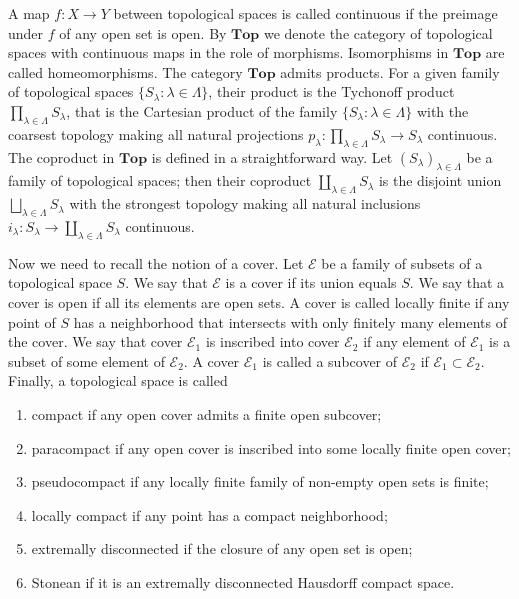 A map $f:X\to Y$ between topological spaces is called continuous if the preimage
under $f$ of any open set is open. By $\mathbf{Top}$ we denote the category of
topological spaces with continuous maps in the role of morphisms. Isomorphisms
in $\mathbf{Top}$ are called homeomorphisms. The category $\mathbf{Top}$ admits
products. For a given family of topological spaces $
\{S_\lambda:\lambda\in\Lambda \}$, their product is the Tychonoff product
$\prod_{\lambda\in\Lambda}S_\lambda$, that is the Cartesian product of the
family $ \{S_\lambda:\lambda\in\Lambda \}$ with the coarsest topology making all
natural projections $p_\lambda:\prod_{\lambda\in\Lambda}S_\lambda\to S_\lambda$
continuous. The coproduct in $\mathbf{Top}$ is defined in a straightforward way.
Let $(S_\lambda)_{\lambda\in\Lambda}$ be a family of topological spaces; then their
coproduct $\coprod_{\lambda\in\Lambda} S_\lambda$ is the disjoint union 
$\bigsqcup_{\lambda\in\Lambda} S_\lambda$ with the strongest topology making all
natural inclusions $i_\lambda:S_\lambda\to \coprod_{\lambda\in\Lambda}S_\lambda$ 
continuous.

Now we need to recall the notion of a cover.
Let $\mathcal{E}$ be a family of subsets of a topological space $S$. We say that
$\mathcal{E}$ is a cover if its union equals $S$. We say that a cover is open if
all its elements are open sets. A cover is called locally finite if any point of
$S$ has a neighborhood that intersects with only finitely many elements of the cover.
We say that cover $\mathcal{E}_1$ is inscribed into cover $\mathcal{E}_2$ if any
element of $\mathcal{E}_1$ is a subset of some element of $\mathcal{E}_2$. A
cover $\mathcal{E}_1$ is called a subcover of $\mathcal{E}_2$ if
$\mathcal{E}_1\subset\mathcal{E}_2$. Finally, a topological space is called 
\begin{enumerate}[label = (\roman*)]
  \item compact if any open cover admits a finite open subcover; 

  \item paracompact if any open cover is inscribed into some locally finite
  open cover;
  
  \item pseudocompact if any locally finite family of non-empty open sets
  is finite;

  \item locally compact if any point has a compact neighborhood;

  \item extremally disconnected if the closure of any open set is
  open;

  \item Stonean if it is an extremally disconnected Hausdorff compact space.
\end{enumerate}

